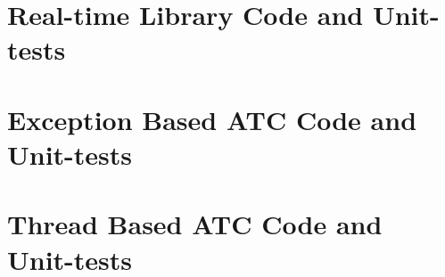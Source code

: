 
\section{Real-time Library Code and Unit-tests}

\section{Exception Based ATC Code and Unit-tests}

\section{Thread Based ATC Code and Unit-tests}

